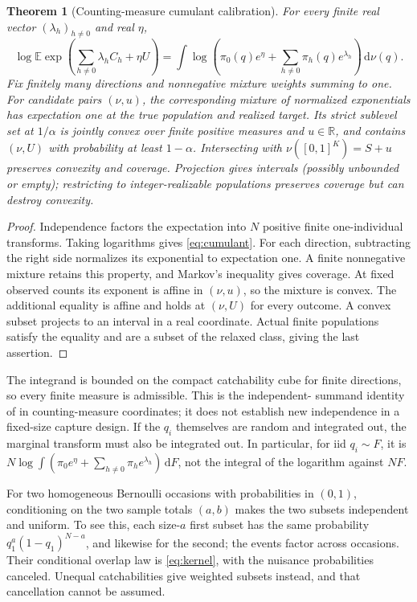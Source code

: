 \documentclass[11pt]{article}
\newtheorem{theorem}{Theorem}[section]
\theoremstyle{remark}\newtheorem{remark}[theorem]{Remark}
\newcommand{\E}{\mathbb E}\newcommand{\PP}{\mathbb P}
\newcommand{\dd}{\,\mathrm d}\newcommand{\ind}{\mathbf1}
\begin{document}
\begin{theorem}[Counting-measure cumulant calibration]\label{thm:history}
For every finite real vector $(\lambda_h)_{h\ne0}$ and real $\eta$,
\begin{equation}\label{eq:cumulant}
 \log\E\exp\left(\sum_{h\ne0}\lambda_h C_h+\eta U\right)
 =\int\log\left(\pi_0(q)e^\eta+
       \sum_{h\ne0}\pi_h(q)e^{\lambda_h}\right)\dd\nu(q).
\end{equation}
Fix finitely many directions and nonnegative mixture weights summing to one.
For candidate pairs $(\nu,u)$, the corresponding mixture of normalized
exponentials has expectation one at the true population and realized target.
Its strict sublevel set at $1/\alpha$ is jointly convex over finite positive
measures and $u\in\mathbb R$, and contains $(\nu,U)$ with probability at
least $1-\alpha$. Intersecting with $\nu([0,1]^K)=S+u$ preserves convexity
and coverage. Projection gives intervals (possibly unbounded or empty);
restricting to integer-realizable populations preserves coverage but can
destroy convexity.
\end{theorem}
\begin{proof}
Independence factors the expectation into $N$ positive finite one-individual
transforms. Taking logarithms gives \eqref{eq:cumulant}. For each direction,
subtracting the right side normalizes its exponential to expectation one.
A finite nonnegative mixture retains this property, and Markov's inequality
gives coverage. At fixed observed counts its exponent is affine in $(\nu,u)$,
so the mixture is convex. The additional equality is affine and holds at
$(\nu,U)$ for every outcome. A convex subset projects to an interval in a
real coordinate. Actual finite populations satisfy the equality and are a
subset of the relaxed class, giving the last assertion.
\end{proof}
The integrand is bounded on the compact catchability cube for finite
directions, so every finite measure is admissible. This is the independent-
summand identity of \cite{LongCumulants} in counting-measure coordinates;
it does not establish new independence in a fixed-size capture design.
If the $q_i$ themselves are random and integrated out, the marginal transform
must also be integrated out. In particular, for iid $q_i\sim F$, it is
$N\log\int(\pi_0e^\eta+\sum_{h\ne0}\pi_he^{\lambda_h})\dd F$, not the
integral of the logarithm against $NF$.

For two homogeneous Bernoulli occasions with probabilities in $(0,1)$,
conditioning on the two sample totals $(a,b)$ makes the two subsets independent
and uniform. To see this, each size-$a$ first subset has the same probability
$q_1^a(1-q_1)^{N-a}$, and likewise for the second; the events factor across
occasions. Their conditional overlap law is \eqref{eq:kernel}, with the
nuisance probabilities canceled. Unequal catchabilities give weighted subsets
instead, and that cancellation cannot be assumed.
\end{document}
